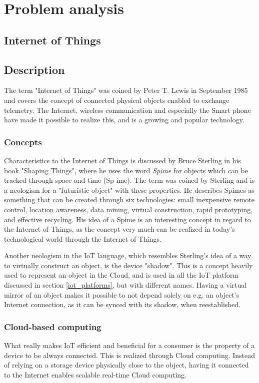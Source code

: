 \section{Problem analysis}
\subsection{Internet of Things}
\subsection{Description}
The term "Internet of Things" was coined by Peter T. Lewis in September 1985 and covers the concept of connected physical objects enabled to exchange telemetry. The Internet, wireless communication and especially the Smart phone have made it possible to realize this, and is a growing and popular technology. 

\subsubsection{Concepts}
Characteristics to the Internet of Things is discussed by Bruce Sterling in his book "Shaping Things", where he uses the word \textit{Spime} for objects which can be tracked through space and time (Sp-ime). The term was coined by Sterling and is a neologism for a "futuristic object" with these properties. He describes Spimes as something that can be created through six technologies: small inexpensive remote control, location awareness, data mining, virtual construction, rapid prototyping, and effective recycling. His idea of a Spime is an interesting concept in regard to the Internet of Things, as the concept very much can be realized in today's technological world through the Internet of Things.

Another neologism in the IoT language, which resembles Sterling's idea of a way to virtually construct an object, is the device "shadow". This is a concept heavily used to represent an object in the Cloud, and is used in all the IoT platform discussed in section \ref{iot_platforms}, but with different names. Having a virtual mirror of an object makes it possible to not depend solely on e.g. an object's Internet connection, as it can be synced with its shadow, when reestablished. 

\subsubsection{Cloud-based computing}
What really makes IoT efficient and beneficial for a consumer is the property of a device to be always connected. This is realized through Cloud computing. Instead of relying on a storage device physically close to the object, having it connected to the Internet enables scalable real-time Cloud computing. 

